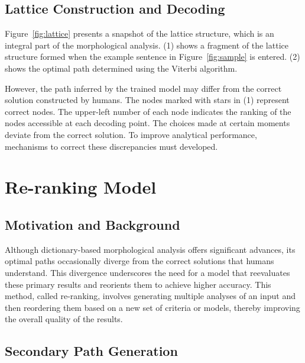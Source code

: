 \documentclass[AMS,STIX2COL]{WileyNJD-v2}
\begin{document}
    \subsection{Lattice Construction and Decoding}\label{subsec:lattice-construction-and-decoding}

    Figure~\ref{fig:lattice} presents a snapshot of the lattice structure, which is an integral part of the morphological analysis.
    (1) shows a fragment of the lattice structure formed when the example sentence in Figure~\ref{fig:sample} is entered.
    (2) shows the optimal path determined using the Viterbi algorithm.

    However, the path inferred by the trained model may differ from the correct solution constructed by humans.
    The nodes marked with stars in (1) represent correct nodes.
    The upper-left number of each node indicates the ranking of the nodes accessible at each decoding point.
    The choices made at certain moments deviate from the correct solution.
    To improve analytical performance, mechanisms to correct these discrepancies must developed.


    \section{Re-ranking Model}\label{sec:reranking-model}

    \subsection{Motivation and Background}\label{subsec:motivation-and-background}

    Although dictionary-based morphological analysis offers significant advances, its optimal paths occasionally diverge from the correct solutions that humans understand.
    This divergence underscores the need for a model that reevaluates these primary results and reorients them to achieve higher accuracy.
    This method, called re-ranking, involves generating multiple analyses of an input and then reordering them based on a new set of criteria or models, thereby improving the overall quality of the results.

    \subsection{Secondary Path Generation}\label{subsec:secondary-path-generation}
\end{document}
